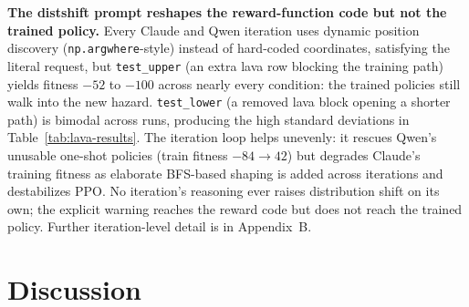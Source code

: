 \documentclass[11pt]{article}
\begin{document}
\textbf{The distshift prompt reshapes the reward-function code but not the trained policy.} Every Claude and Qwen iteration uses dynamic position discovery (\texttt{np.argwhere}-style) instead of hard-coded coordinates, satisfying the literal request, but \texttt{test\_upper} (an extra lava row blocking the training path) yields fitness $-52$ to $-100$ across nearly every condition: the trained policies still walk into the new hazard. \texttt{test\_lower} (a removed lava block opening a shorter path) is bimodal across runs, producing the high standard deviations in Table~\ref{tab:lava-results}. The iteration loop helps unevenly: it rescues Qwen's unusable one-shot policies (train fitness $-84 \to 42$) but degrades Claude's training fitness as elaborate BFS-based shaping is added across iterations and destabilizes PPO. No iteration's reasoning ever raises distribution shift on its own; the explicit warning reaches the reward code but does not reach the trained policy. Further iteration-level detail is in Appendix~B.

\section{Discussion}
\end{document}
